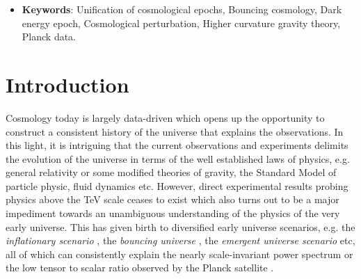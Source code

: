 \documentclass{article}
\begin{document}
\begin{itemize}
 \item \textbf{Keywords}: {Unification of cosmological epochs, Bouncing cosmology, Dark energy epoch, Cosmological perturbation, 
 Higher curvature gravity theory, Planck data.}
\end{itemize}


\section{Introduction}
\label{Intro}
Cosmology today is largely data-driven which opens up the opportunity to construct a  consistent history of the universe that explains the observations. 
In this light, it is intriguing that the current observations and experiments delimits the evolution of the universe 
in terms of the well established laws of physics, e.g. general relativity or some modified theories of gravity, 
the Standard Model of particle physic, fluid dynamics etc. However, direct experimental results probing physics above the 
TeV scale ceases to exist which also turns out to be a major impediment towards an unambiguous understanding of the physics of 
the very early universe. This has given birth to diversified early universe scenarios, e.g. the \emph{inflationary scenario} 
\cite{guth,Linde:2005ht,Langlois:2004de,Riotto:2002yw,barrow1,barrow2,Baumann:2009ds}, 
the \emph{bouncing universe} \cite{Brandenberger:2012zb,Brandenberger:2016vhg,Battefeld:2014uga,Novello:2008ra,Cai:2014bea,Cai:2016thi,
deHaro:2015wda,Lehners:2011kr,Lehners:2008vx,
Cai:2016hea,Colin:2017dwv,Cattoen:2005dx,Li:2014era,Brizuela:2009nk,Cai:2013kja,Quintin:2014oea,Cai:2013vm,pinto,
Koehn:2015vvy,Nojiri:2016ygo,Odintsov:2020zct,Koehn:2013upa,Battarra:2014kga,Martin:2001ue,Khoury:2001wf,
Hackworth:2004xb,Johnson:2011aa,Peter:2002cn,Gasperini:2003pb,Creminelli:2004jg,Lehners:2015mra,
Lehners:2013cka,Cai:2014xxa,Cai:2007qw,Barrow:2004ad,Haro:2015zda,Das:2017jrl,
Cai:2008qw,Finelli:2001sr,Cai:2011ci,Haro:2015zta,Cai:2011zx,Brandenberger:2009yt,deHaro:2014kxa,Odintsov:2014gea,
Qiu:2010ch,Bamba:2012ka,deHaro:2012xj,Nojiri:2019lqw,Elizalde:2019tee,Elizalde:2020zcb,WilsonEwing:2012pu}, 
the \emph{emergent universe scenario} \cite{Ellis:2003qz,Paul:2020bje,Li:2019laq} etc, all of which can consistently explain the nearly 
scale-invariant power spectrum or the low tensor to scalar ratio observed by the Planck satellite \cite{Akrami:2018odb}.  
\end{document}
